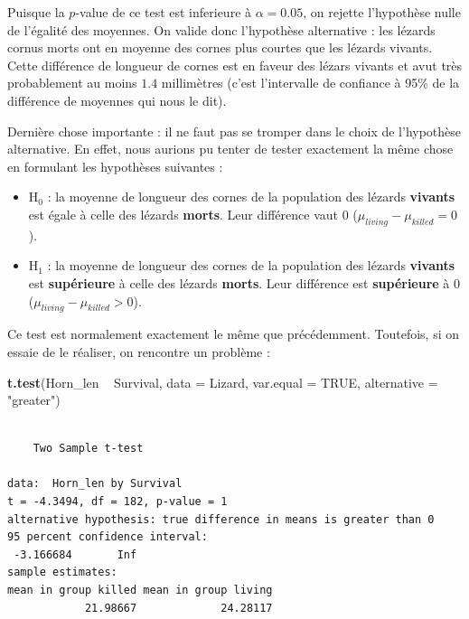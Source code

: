 \documentclass[a4paperpaper,]{article}
\newenvironment{Shaded}{\begin{snugshade}}{\end{snugshade}}
\newcommand{\DataTypeTok}[1]{\textcolor[rgb]{0.00,0.34,0.68}{#1}}
\newcommand{\KeywordTok}[1]{\textcolor[rgb]{0.12,0.11,0.11}{\textbf{#1}}}
\newcommand{\NormalTok}[1]{\textcolor[rgb]{0.12,0.11,0.11}{#1}}
\newcommand{\OperatorTok}[1]{\textcolor[rgb]{0.12,0.11,0.11}{#1}}
\newcommand{\OtherTok}[1]{\textcolor[rgb]{0.00,0.43,0.16}{#1}}
\newcommand{\StringTok}[1]{\textcolor[rgb]{0.75,0.01,0.01}{#1}}
\providecommand{\tightlist}{%
  \setlength{\itemsep}{0pt}\setlength{\parskip}{0pt}}
\begin{document}
Puisque la \(p\)-value de ce test est inferieure à \(\alpha = 0.05\), on rejette l'hypothèse nulle de l'égalité des moyennes. On valide donc l'hypothèse alternative : les lézards cornus morts ont en moyenne des cornes plus courtes que les lézards vivants. Cette différence de longueur de cornes est en faveur des lézars vivants et avut très probablement au moins \(1.4\) millimètres (c'est l'intervalle de confiance à 95\% de la différence de moyennes qui nous le dit).

Dernière chose importante : il ne faut pas se tromper dans le choix de l'hypothèse alternative. En effet, nous aurions pu tenter de tester exactement la même chose en formulant les hypothèses suivantes :

\begin{itemize}
\tightlist
\item
  H\(_0\) : la moyenne de longueur des cornes de la population des lézards \textbf{vivants} est égale à celle des lézards \textbf{morts}. Leur différence vaut 0 (\(\mu_{living}-\mu_{killed} = 0\)).
\item
  H\(_1\) : la moyenne de longueur des cornes de la population des lézards \textbf{vivants} est \textbf{supérieure} à celle des lézards \textbf{morts}. Leur différence est \textbf{supérieure} à 0 (\(\mu_{living}-\mu_{killed} > 0\)).
\end{itemize}

Ce test est normalement exactement le même que précédemment. Toutefois, si on essaie de le réaliser, on rencontre un problème :

\begin{Shaded}
\begin{Highlighting}[]
\KeywordTok{t.test}\NormalTok{(Horn_len }\OperatorTok{~}\StringTok{ }\NormalTok{Survival, }
       \DataTypeTok{data =}\NormalTok{ Lizard, }\DataTypeTok{var.equal =} \OtherTok{TRUE}\NormalTok{,}
       \DataTypeTok{alternative =} \StringTok{"greater"}\NormalTok{)}
\end{Highlighting}
\end{Shaded}

\begin{verbatim}

    Two Sample t-test

data:  Horn_len by Survival
t = -4.3494, df = 182, p-value = 1
alternative hypothesis: true difference in means is greater than 0
95 percent confidence interval:
 -3.166684       Inf
sample estimates:
mean in group killed mean in group living 
            21.98667             24.28117 
\end{verbatim}
\end{document}
